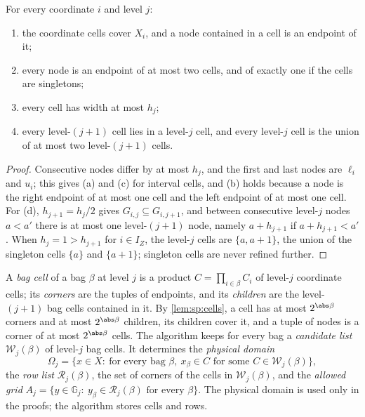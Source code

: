 \begin{lemma}\label{lem:sp:cells}
For every coordinate $i$ and level $j$:
\begin{enumerate}[label=(\alph*)]
\item the coordinate cells cover $X_i$, and a node contained in a cell is an
endpoint of it;
\item every node is an endpoint of at most two cells, and of exactly one if
the cells are singletons;
\item every cell has width at most $h_j$;
\item every level-$(j+1)$ cell lies in a level-$j$ cell, and every level-$j$
cell is the union of at most two level-$(j+1)$ cells.
\end{enumerate}
\end{lemma}

\begin{proof}
Consecutive nodes differ by at most $h_j$, and the first and last nodes are
$\ell_i$ and $u_i$; this gives (a) and (c) for interval cells, and (b) holds
because a node is the right endpoint of at most one cell and the left
endpoint of at most one cell. For (d), $h_{j+1}=h_j/2$ gives
$G_{i,j}\subseteq G_{i,j+1}$, and between consecutive level-$j$ nodes
$a<a'$ there is at most one level-$(j+1)$ node, namely $a+h_{j+1}$ if
$a+h_{j+1}<a'$. When $h_j=1>h_{j+1}$ for $i\in I_Z$, the level-$j$ cells
are $\{a,a+1\}$, the union of the singleton cells $\{a\}$ and $\{a+1\}$;
singleton cells are never refined further.
\end{proof}

A \emph{bag cell} of a bag $\beta$ at level $j$ is a product
$C=\prod_{i\in\beta}C_i$ of level-$j$ coordinate cells; its \emph{corners}
are the tuples of endpoints, and its \emph{children} are the level-$(j+1)$
bag cells contained in it. By \cref{lem:sp:cells}, a cell has at most
$2^{\abs\beta}$ corners and at most $2^{\abs\beta}$ children, its children
cover it, and a tuple of nodes is a corner of at most $2^{\abs\beta}$ cells.
The algorithm keeps for every bag a \emph{candidate list} $\mathcal W_j(\beta)$
of level-$j$ bag cells. It determines the \emph{physical domain}
\[
 \Omega_j=\{x\in X:\ \text{for every bag }\beta,\ x_\beta\in C
 \text{ for some }C\in\mathcal W_j(\beta)\},
\]
the \emph{row list} $\mathcal R_j(\beta)$, the set of corners of the cells in
$\mathcal W_j(\beta)$, and the \emph{allowed grid}
$A_j=\{y\in\mathbb G_j:\ y_\beta\in\mathcal R_j(\beta)\text{ for every }\beta\}$.
The physical domain is used only in the proofs; the algorithm stores cells
and rows.

